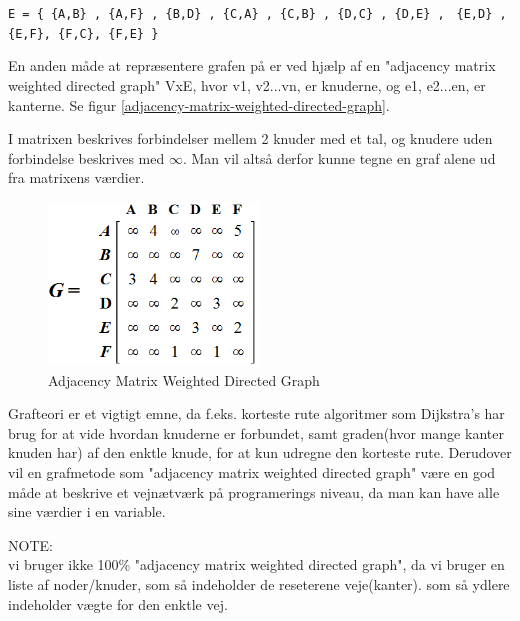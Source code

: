 \vspace{5mm}

\verb!E = { {A,B} , {A,F} , {B,D} , {C,A} , {C,B} , {D,C} , {D,E} ,!
\verb! {E,D} , {E,F}, {F,C}, {F,E} }!

\vspace{5mm}

En anden måde at repræsentere grafen på er ved hjælp af en "adjacency matrix weighted directed graph" VxE, hvor v1, v2...vn, er knuderne, og e1, e2...en, er kanterne. Se figur \ref{adjacency-matrix-weighted-directed-graph}. 

I matrixen beskrives forbindelser mellem 2 knuder med et tal, og knudere uden forbindelse beskrives med $\infty$. Man vil altså derfor kunne tegne en graf alene ud fra matrixens værdier.

\begin{figure}[H]
\begin{adjustbox}{width=0.5\textwidth,center=\textwidth}
\centering
\includegraphics[width=0.5\textwidth]{Pictures/Teoriafsnit/Figurfiler/adjacency_matrix_weighted_directed_graph.PNG}
\end{adjustbox}
\caption{Adjacency Matrix Weighted Directed Graph}
\label{fig:adjacency-matrix-weighted-directed-graph}
\end{figure}

Grafteori er et vigtigt emne, da f.eks. korteste rute algoritmer som Dijkstra's har brug for at vide hvordan knuderne er forbundet, samt graden(hvor mange kanter knuden har) af den enktle knude, for at kun udregne den korteste rute. Derudover vil en grafmetode som "adjacency matrix weighted directed graph" være en god måde at beskrive et vejnætværk på programerings niveau, da man kan have alle sine værdier i en variable.

\vspace{5mm}


NOTE: \\
vi bruger ikke 100\% "adjacency matrix weighted directed graph", da vi bruger en liste af noder/knuder, som så indeholder de reseterene veje(kanter). som så ydlere indeholder vægte for den enktle vej.



